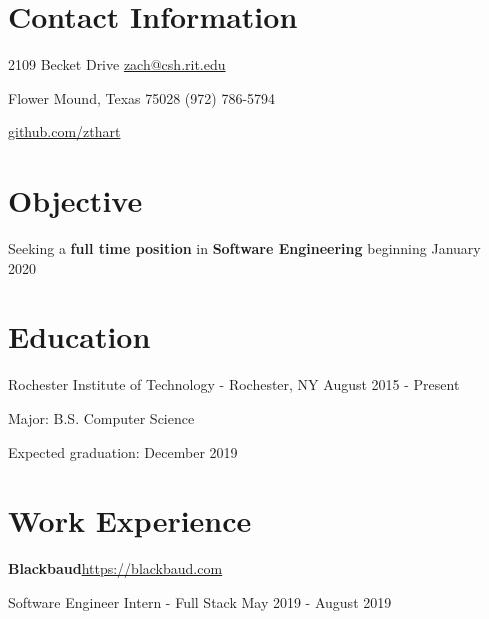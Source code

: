 \documentclass[margin,line]{resume}
\newcommand{\rurl}[1]{\hfill {\footnotesize \url{#1}}}
\newcommand{\rdate}[1]{\hfill {\small #1}}
\begin{document}
\begin{resume}
\section{\mysidestyle Contact Information}
	\begin{asparablank}
		\item 2109 Becket Drive  \hfill \href{mailto:zach@csh.rit.edu}{zach@csh.rit.edu}
		\item Flower Mound, Texas 75028 \hfill (972) 786-5794
		\item \hfill \rurl{github.com/zthart}
    \end{asparablank}

\section{\mysidestyle Objective}
	\begin{asparablank}
    	\item Seeking a \textbf{full time position} in \textbf{Software Engineering} beginning January 2020
        \normalsize
        \\
	\end{asparablank}

\section{\mysidestyle Education}
	\begin{compactdesc}
		\item[Rochester Institute of Technology] - Rochester, NY \rdate{August 2015 - Present}
		\begin{compactitem} { \small
			\item Major: B.S. Computer Science
			\item Expected graduation: December 2019
		} \end{compactitem}
	\end{compactdesc}


\section{\mysidestyle Work Experience}
	\begin{asparablank}
	\item{\bf Blackbaud}\rurl{https://blackbaud.com}
	\small \item Software Engineer Intern - Full Stack \hfill May 2019 - August 2019 \\


\end{asparablank}
\end{resume}
\end{document}
